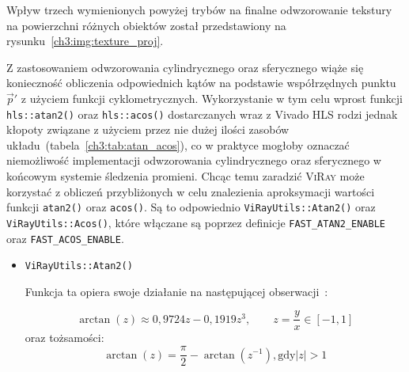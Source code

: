\begin{enumerate}
Wpływ trzech wymienionych powyżej trybów na finalne odwzorowanie tekstury na powierzchni różnych obiektów został przedstawiony na rysunku~\ref{ch3:img:texture_proj}.



Z zastosowaniem odwzorowania cylindrycznego oraz sferycznego wiąże się konieczność obliczenia odpowiednich kątów na podstawie współrzędnych punktu $\vec{p}'$ z użyciem funkcji cyklometrycznych. Wykorzystanie w tym celu wprost funkcji \texttt{hls::atan2()} oraz \texttt{hls::acos()} dostarczanych wraz z Vivado HLS rodzi jednak kłopoty związane z użyciem przez nie dużej ilości zasobów układu~(tabela~\ref{ch3:tab:atan_acos}), co w praktyce mogłoby oznaczać niemożliwość implementacji odwzorowania cylindrycznego oraz sferycznego w końcowym systemie śledzenia promieni. Chcąc temu zaradzić \textsc{ViRay} może korzystać z obliczeń przybliżonych w celu znalezienia aproksymacji wartości funkcji \texttt{atan2()} oraz \texttt{acos()}. Są to odpowiednio \texttt{ViRayUtils::Atan2()} oraz \texttt{ViRayUtils::Acos()}, które włączane są poprzez definicje \texttt{FAST\_ATAN2\_ENABLE} oraz \texttt{FAST\_ACOS\_ENABLE}.




\begin{itemize}
\item \texttt{ViRayUtils::Atan2()}

Funkcja ta opiera swoje działanie na następującej obserwacji~\cite{ATAN_APPROX}:

\begin{equation}
\arctan(z)\approx 0,9724z - 0,1919z^3,\qquad z=\frac{y}{x}\in[-1, 1]
\end{equation}
oraz tożsamości:
\begin{equation}
\arctan(z) = \frac{\pi}{2} - \arctan\left(z^{-1}\right), \mathrm{gdy} \left| z \right| > 1
\end{equation}


\end{itemize}
\end{enumerate}
